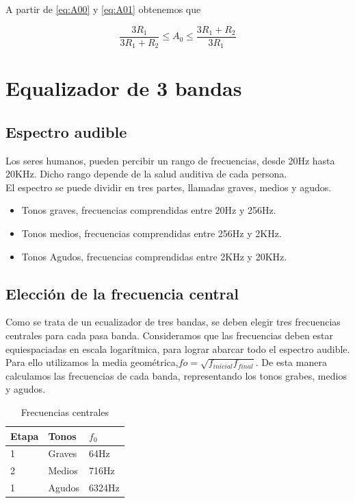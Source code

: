 \documentclass[../../tc_tp3_main.tex]{subfiles}
\begin{document}
A partir de \ref{eq:A00} y \ref{eq:A01} obtenemos que

\begin{equation}
\frac {3R_1}{3R_1 + R_2} \leq A_0  \leq \frac{3R_1 + R_2}{3R_1}\label{eq:rangoA}
\end{equation}


\section{Equalizador de 3 bandas}

\subsection{Espectro audible}
Los seres humanos, pueden percibir un rango de frecuencias, desde 20Hz hasta 20KHz. Dicho rango depende de la salud auditiva de cada persona.
\\ El espectro se puede dividir en tres partes, llamadas graves, medios y agudos.

\begin{itemize}
  \item Tonos graves, frecuencias comprendidas entre 20Hz y 256Hz.
  \item Tonos medios, frecuencias comprendidas entre 256Hz y 2KHz.
  \item Tonos Agudos, frecuencias comprendidas entre 2KHz y 20KHz.
\end{itemize}
\subsection{Elección de la frecuencia central}

Como se trata de un ecualizador de tres bandas, se deben elegir tres frecuencias centrales para cada  pasa banda. Consideramos que las frecuencias deben estar equiespaciadas en escala logarítmica, para lograr abarcar todo el espectro audible.
Para ello utilizamos la media geométrica,$fo=\sqrt{f_{inicial}f_{final}}$. De esta manera calculamos las frecuencias de cada banda, representando los tonos grabes, medios y agudos.
\begin{table}[h]
\begin{center}
\begin{tabular}{|l|l|l|}
\hline
Etapa & Tonos & $f_0$ \\
\hline \hline
1&Graves  &64Hz \\ \hline
2&Medios  &716Hz \\ \hline
1&Agudos  &6324Hz \\ \hline

\end{tabular}
\caption{Frecuencias centrales} 
\label{tab:MFc}
\end{center}
\end{table}
\end{document}
